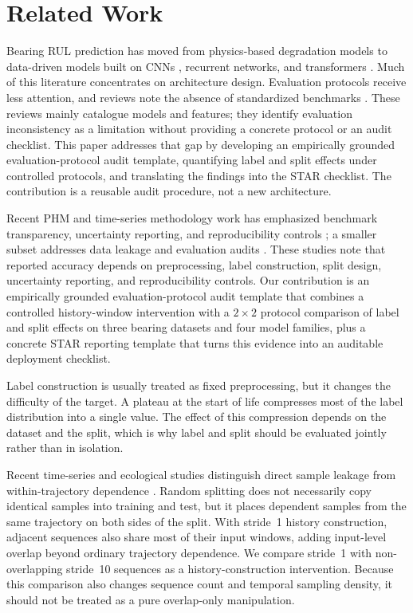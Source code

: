 \documentclass[pdflatex,sn-basic,NameDate]{sn-jnl}
\begin{document}
\section{Related Work}
Bearing RUL prediction has moved from physics-based degradation models \citep{paris1963critical,kotzalas2004fatigue,li2022physics} to data-driven models built on CNNs \citep{ince2016real}, recurrent networks, and transformers \citep{rul_lstm_uq_2022,reg_lstm_2021,transformer_tim_2023}. Much of this literature concentrates on architecture design. Evaluation protocols receive less attention, and reviews note the absence of standardized benchmarks \citep{zhao2021deep,caesarendra2021machine}. These reviews mainly catalogue models and features; they identify evaluation inconsistency as a limitation without providing a concrete protocol or an audit checklist. This paper addresses that gap by developing an empirically grounded evaluation-protocol audit template, quantifying label and split effects under controlled protocols, and translating the findings into the STAR checklist. The contribution is a reusable audit procedure, not a new architecture.

Recent PHM and time-series methodology work has emphasized benchmark transparency, uncertainty reporting, and reproducibility controls \citep{phmconf2025rethinking,review2020bearing,mst2024cqr,icsrs2023splitconformal,phme2026conformal,ress2022bayesian,eaai2025explainable}; a smaller subset addresses data leakage and evaluation audits \citep{leakage_nature,leakage_frontiers}. These studies note that reported accuracy depends on preprocessing, label construction, split design, uncertainty reporting, and reproducibility controls. Our contribution is an empirically grounded evaluation-protocol audit template that combines a controlled history-window intervention with a $2\times 2$ protocol comparison of label and split effects on three bearing datasets and four model families, plus a concrete STAR reporting template that turns this evidence into an auditable deployment checklist.

Label construction is usually treated as fixed preprocessing, but it changes the difficulty of the target. A plateau at the start of life compresses most of the label distribution into a single value. The effect of this compression depends on the dataset and the split, which is why label and split should be evaluated jointly rather than in isolation.

Recent time-series and ecological studies distinguish direct sample leakage from within-trajectory dependence \citep{leakage_nature,leakage_frontiers}. Random splitting does not necessarily copy identical samples into training and test, but it places dependent samples from the same trajectory on both sides of the split. With stride~1 history construction, adjacent sequences also share most of their input windows, adding input-level overlap beyond ordinary trajectory dependence. We compare stride~1 with non-overlapping stride~10 sequences as a history-construction intervention. Because this comparison also changes sequence count and temporal sampling density, it should not be treated as a pure overlap-only manipulation.
\end{document}

